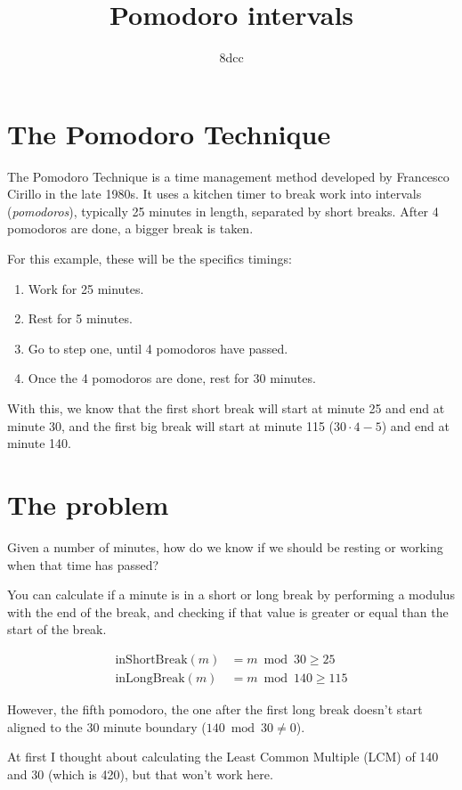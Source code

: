 \documentclass{amsart}
\title{Pomodoro intervals}
\author{8dcc}
\begin{document}
\maketitle

\section{The Pomodoro Technique}

The Pomodoro Technique is a time management method developed by Francesco
Cirillo in the late 1980s. It uses a kitchen timer to break work into intervals
(\textit{pomodoros}), typically 25 minutes in length, separated by short
breaks. After 4 pomodoros are done, a bigger break is taken.

For this example, these will be the specifics timings:

\begin{enumerate}
\item Work for 25 minutes.
\item Rest for 5 minutes.
\item Go to step one, until 4 pomodoros have passed.
\item Once the 4 pomodoros are done, rest for 30 minutes.
\end{enumerate}

With this, we know that the first short break will start at minute 25 and end at
minute 30, and the first big break will start at minute 115 ($30 \cdot 4 - 5$)
and end at minute 140.

\section{The problem}

Given a number of minutes, how do we know if we should be resting or working
when that time has passed?

You can calculate if a minute is in a short or long break by performing a
modulus with the end of the break, and checking if that value is greater or
equal than the start of the break.

\begin{align*}
  \text{inShortBreak}(m) &= m \bmod 30 \geq 25 \\
  \text{inLongBreak}(m)  &= m \bmod 140 \geq 115
\end{align*}

However, the fifth pomodoro, the one after the first long break doesn't start
aligned to the 30 minute boundary ($140 \bmod 30 \neq 0$).

At first I thought about calculating the Least Common Multiple (LCM) of 140 and
30 (which is 420), but that won't work here.
\end{document}
